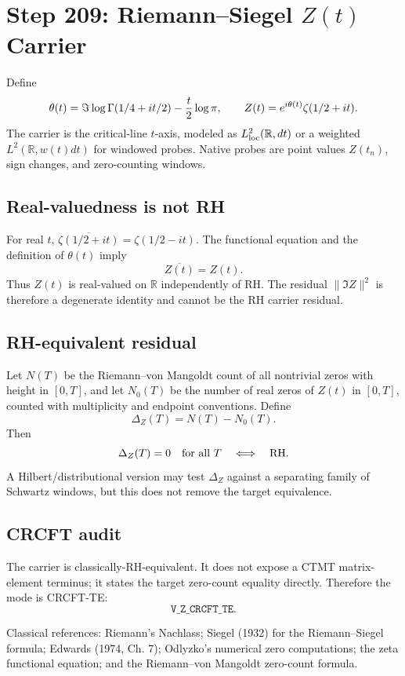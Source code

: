 \documentclass[11pt]{article}
\begin{document}
\section*{Step 209: Riemann--Siegel \(Z(t)\) Carrier}

Define
\[
  \theta(t)=\Im\log\Gamma(1/4+it/2)-{t\over2}\log\pi,
  \qquad
  Z(t)=e^{i\theta(t)}\zeta(1/2+it).
\]
The carrier is the critical-line \(t\)-axis, modeled as
\(L^2_{\rm loc}(\mathbb R,dt)\) or a weighted \(L^2(\mathbb R,w(t)dt)\)
for windowed probes.  Native probes are point values \(Z(t_n)\), sign changes,
and zero-counting windows.

\subsection*{Real-valuedness is not RH}

For real \(t\), \(\overline{\zeta(1/2+it)}=\zeta(1/2-it)\).  The functional
equation and the definition of \(\theta(t)\) imply
\[
  \overline{Z(t)}=Z(t).
\]
Thus \(Z(t)\) is real-valued on \(\mathbb R\) independently of RH.  The residual
\(\|\Im Z\|^2\) is therefore a degenerate identity and cannot be the RH carrier
residual.

\subsection*{RH-equivalent residual}

Let \(N(T)\) be the Riemann--von Mangoldt count of all nontrivial zeros with
height in \([0,T]\), and let \(N_0(T)\) be the number of real zeros of \(Z(t)\)
in \([0,T]\), counted with multiplicity and endpoint conventions.  Define
\[
  \Delta_Z(T)=N(T)-N_0(T).
\]
Then
\[
  \Delta_Z(T)=0\quad \hbox{for all }T
  \quad\Longleftrightarrow\quad \hbox{RH}.
\]
A Hilbert/distributional version may test \(\Delta_Z\) against a separating
family of Schwartz windows, but this does not remove the target equivalence.

\subsection*{CRCFT audit}

The carrier is classically-RH-equivalent.  It does not expose a CTMT
matrix-element terminus; it states the target zero-count equality directly.
Therefore the mode is CRCFT-TE:
\[
  \boxed{\texttt{V\_Z\_CRCFT\_TE}.}
\]

Classical references: Riemann's Nachlass; Siegel (1932) for the
Riemann--Siegel formula; Edwards (1974, Ch. 7); Odlyzko's numerical
zero computations; the zeta functional equation; and the
Riemann--von Mangoldt zero-count formula.
\end{document}

